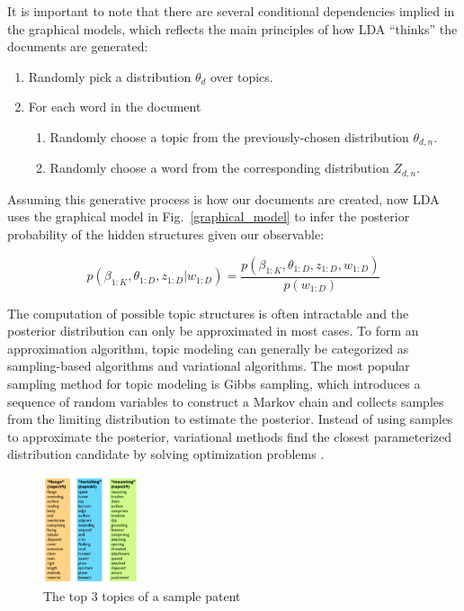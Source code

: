 \documentclass[conference]{IEEEtran}
\begin{document}
It is important to note that there are several conditional dependencies implied in the graphical models, which reflects the main principles of how LDA ``thinks'' the documents are generated:

\begin{enumerate}
\item Randomly pick a distribution $\theta_d$ over topics.
\item For each word in the document
	\begin{enumerate}
	\item Randomly choose a topic from the previously-chosen distribution $\theta_{d,n}$.
	\item Randomly choose a word from the corresponding distribution $Z_{d,n}$.
	\end{enumerate}
\end{enumerate}

Assuming this generative process is how our documents are created, now LDA uses the graphical model in Fig.~\ref{graphical_model} to infer the posterior probability of the hidden structures given our observable:

\begin{equation*}
p(\beta_{1:K}, \theta_{1:D}, z_{1:D} | w_{1:D}) = \frac{p(\beta_{1:K}, \theta_{1:D}, z_{1:D}, w_{1:D})}{p(w_{1:D})}
\end{equation*}

The computation of possible topic structures is often intractable and the posterior distribution can only be approximated in most cases. To form an approximation algorithm, topic modeling can generally be categorized as sampling-based algorithms and variational algorithms. The most popular sampling method for topic modeling is Gibbs sampling, which introduces a sequence of random variables to construct a Markov chain and collects samples from the limiting distribution to estimate the posterior. Instead of using samples to approximate the posterior, variational methods find the closest parameterized distribution candidate by solving optimization problems \cite{lda2003} \cite{bach2010}.

\begin{figure}[h]
	\center
	\includegraphics[width=0.25\textwidth]{fig/topics.png}
	\caption{The top 3 topics of a sample patent}
	\label{top3topics}
\end{figure}
\end{document}

